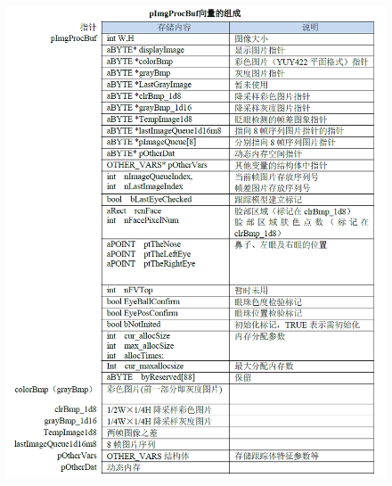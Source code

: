 \documentclass[12pt,hyperref,a4paper,UTF8]{ctexart}
\begin{document}
        \begin{figure}[H]
            \centering
            \includegraphics[width=\textwidth]{./figures/fig/image2.png}
            \label{fig:your_image_label}
        \end{figure}
\end{document}
